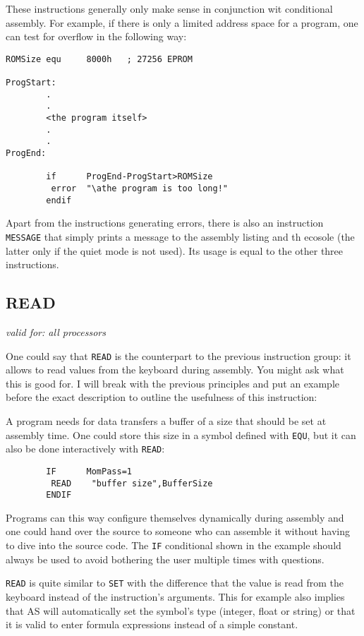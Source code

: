 \documentclass[12pt,twoside]{report}
\makeatletter
\newcommand{\tty}[1]{{\tt #1}}
\newcommand{\ttindex}[1]{\index{#1@{\tt #1}}}
\makeatother
\begin{document}
These instructions generally only make sense in conjunction wit
conditional assembly.  For example, if there is only a limited
address space for a program, one can test for overflow in the
following way:
\begin{verbatim}
ROMSize equ     8000h   ; 27256 EPROM

ProgStart:
        .
        .
        <the program itself>
        .
        .
ProgEnd:

        if      ProgEnd-ProgStart>ROMSize
         error  "\athe program is too long!"
        endif
\end{verbatim}
Apart from the instructions generating errors, there is also an
instruction \tty{MESSAGE} that simply prints a message to the assembly
listing and th ecosole (the latter only if the quiet mode is not used).
Its usage is equal to the other three instructions.


\subsection{READ}
\ttindex{READ}

{\em valid for: all processors}

One could say that \tty{READ} is the counterpart to the previous
instruction group: it allows to read values from the keyboard during
assembly.  You might ask what this is good for.  I will break with
the previous principles and put an example before the exact
description to outline the usefulness of this instruction:

A program needs for data transfers a buffer of a size that should be
set at assembly time.  One could store this size in a symbol defined
with \tty{EQU}, but it can also be done interactively with \tty{READ}:
\begin{verbatim}
        IF      MomPass=1
         READ    "buffer size",BufferSize
        ENDIF
\end{verbatim}
Programs can this way configure themselves dynamically during assembly
and one could hand over the source to someone who can assemble it
without having to dive into the source code.  The \tty{IF} conditional
shown in the example should always be used to avoid bothering the
user multiple times with questions.

\tty{READ} is quite similar to \tty{SET} with the difference that the
value is read from the keyboard instead of the instruction's arguments.
This for example also implies that AS will automatically set the symbol's
type (integer, float or string) or that it is valid to enter formula
expressions instead of a simple constant.
\end{document}
